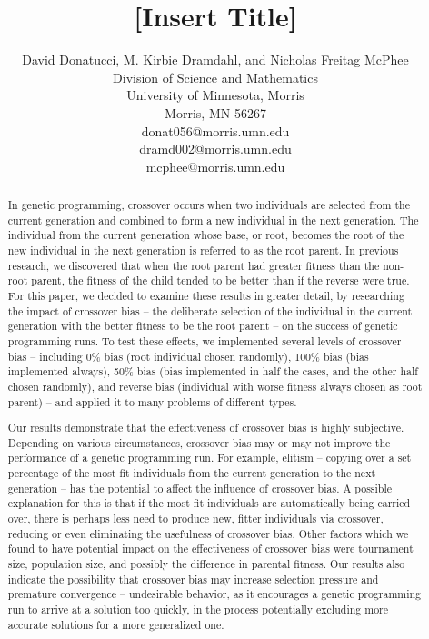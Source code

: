 \documentclass[12pt]{article}
\title{[Insert Title]}
\author{
 		David Donatucci, M. Kirbie Dramdahl, and Nicholas Freitag McPhee\\
        Division of Science and Mathematics\\
        University of Minnesota, Morris\\
        Morris, MN 56267\\
        donat056@morris.umn.edu\\
        dramd002@morris.umn.edu\\
        mcphee@morris.umn.edu\\
}
\date{}
\begin{document}
\pagestyle{plain}

\maketitle

\begin{abstract}

In genetic programming, crossover occurs when two individuals are selected from the current generation and combined to form a new individual in the next generation. The individual from the current generation whose base, or root, becomes the root of the new individual in the next generation is referred to as the root parent. In previous research, we discovered that when the root parent had greater fitness than the non-root parent, the fitness of the child tended to be better than if the reverse were true. For this paper, we decided to examine these results in greater detail, by researching the impact of crossover bias – the deliberate selection of the individual in the current generation with the better fitness to be the root parent – on the success of genetic programming runs. To test these effects, we implemented several levels of crossover bias – including 0\% bias (root individual chosen randomly), 100\% bias (bias implemented always), 50\% bias (bias implemented in half the cases, and the other half chosen randomly), and reverse bias (individual with worse fitness always chosen as root parent) – and applied it to many problems of different types.

Our results demonstrate that the effectiveness of crossover bias is highly subjective. Depending on various circumstances, crossover bias may or may not improve the performance of a genetic programming run. For example, elitism – copying over a set percentage of the most fit individuals from the current generation to the next generation – has the potential to affect the influence of crossover bias. A possible explanation for this is that if the most fit individuals are automatically being carried over, there is perhaps less need to produce new, fitter individuals via crossover, reducing or even eliminating the usefulness of crossover bias. Other factors which we found to have potential impact on the effectiveness of crossover bias were tournament size, population size, and possibly the difference in parental fitness. Our results also indicate the possibility that crossover bias may increase selection pressure and premature convergence – undesirable behavior, as it encourages a genetic programming run to arrive at a solution too quickly, in the process potentially excluding more accurate solutions for a more generalized one.


\end{abstract}
\end{document}
